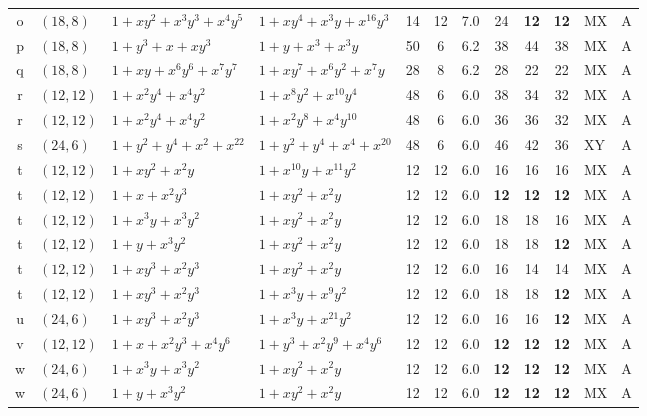 \begin{table}[t]
\begin{tabular*}{\textwidth}{@{\extracolsep{\fill}}clllcccccclc}
o & $(18,8)$ & $1{+}xy^{2}{+}x^{3}y^{3}{+}x^{4}y^{5}$ & $1{+}xy^{4}{+}x^{3}y{+}x^{16}y^{3}$ & 14 & 12 & 7.0 & 24 & \textbf{12} & \textbf{12} & MX & A \\
p & $(18,8)$ & $1{+}y^{3}{+}x{+}xy^{3}$ & $1{+}y{+}x^{3}{+}x^{3}y$ & 50 & 6 & 6.2 & 38 & 44 & 38 & MX & A \\
q & $(18,8)$ & $1{+}xy{+}x^{6}y^{6}{+}x^{7}y^{7}$ & $1{+}xy^{7}{+}x^{6}y^{2}{+}x^{7}y$ & 28 & 8 & 6.2 & 28 & 22 & 22 & MX & A \\
r & $(12,12)$ & $1{+}x^{2}y^{4}{+}x^{4}y^{2}$ & $1{+}x^{8}y^{2}{+}x^{10}y^{4}$ & 48 & 6 & 6.0 & 38 & 34 & 32 & MX & A \\
r & $(12,12)$ & $1{+}x^{2}y^{4}{+}x^{4}y^{2}$ & $1{+}x^{2}y^{8}{+}x^{4}y^{10}$ & 48 & 6 & 6.0 & 36 & 36 & 32 & MX & A \\
s & $(24,6)$ & $1{+}y^{2}{+}y^{4}{+}x^{2}{+}x^{22}$ & $1{+}y^{2}{+}y^{4}{+}x^{4}{+}x^{20}$ & 48 & 6 & 6.0 & 46 & 42 & 36 & XY & A \\
t & $(12,12)$ & $1{+}xy^{2}{+}x^{2}y$ & $1{+}x^{10}y{+}x^{11}y^{2}$ & 12 & 12 & 6.0 & 16 & 16 & 16 & MX & A \\
t & $(12,12)$ & $1{+}x{+}x^{2}y^{3}$ & $1{+}xy^{2}{+}x^{2}y$ & 12 & 12 & 6.0 & \textbf{12} & \textbf{12} & \textbf{12} & MX & A \\
t & $(12,12)$ & $1{+}x^{3}y{+}x^{3}y^{2}$ & $1{+}xy^{2}{+}x^{2}y$ & 12 & 12 & 6.0 & 18 & 18 & 16 & MX & A \\
t & $(12,12)$ & $1{+}y{+}x^{3}y^{2}$ & $1{+}xy^{2}{+}x^{2}y$ & 12 & 12 & 6.0 & 18 & 18 & \textbf{12} & MX & A \\
t & $(12,12)$ & $1{+}xy^{3}{+}x^{2}y^{3}$ & $1{+}xy^{2}{+}x^{2}y$ & 12 & 12 & 6.0 & 16 & 14 & 14 & MX & A \\
t & $(12,12)$ & $1{+}xy^{3}{+}x^{2}y^{3}$ & $1{+}x^{3}y{+}x^{9}y^{2}$ & 12 & 12 & 6.0 & 18 & 18 & \textbf{12} & MX & A \\
u & $(24,6)$ & $1{+}xy^{3}{+}x^{2}y^{3}$ & $1{+}x^{3}y{+}x^{21}y^{2}$ & 12 & 12 & 6.0 & 16 & 16 & \textbf{12} & MX & A \\
v & $(12,12)$ & $1{+}x{+}x^{2}y^{3}{+}x^{4}y^{6}$ & $1{+}y^{3}{+}x^{2}y^{9}{+}x^{4}y^{6}$ & 12 & 12 & 6.0 & \textbf{12} & \textbf{12} & \textbf{12} & MX & A \\
w & $(24,6)$ & $1{+}x^{3}y{+}x^{3}y^{2}$ & $1{+}xy^{2}{+}x^{2}y$ & 12 & 12 & 6.0 & \textbf{12} & \textbf{12} & \textbf{12} & MX & A \\
w & $(24,6)$ & $1{+}y{+}x^{3}y^{2}$ & $1{+}xy^{2}{+}x^{2}y$ & 12 & 12 & 6.0 & \textbf{12} & \textbf{12} & \textbf{12} & MX & A \\
\bottomrule
\end{tabular*}
\renewcommand{\arraystretch}{1.0}
\end{table}

